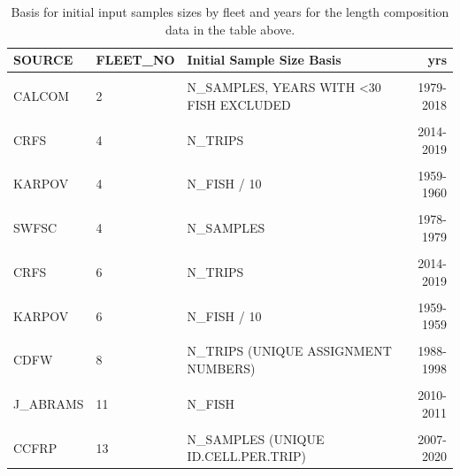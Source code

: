 \documentclass[
  english,
  a4paper,
]{article}
\begin{document}
\begin{table}

\caption{\label{tab:length-inputN}Basis for initial input samples sizes by fleet and years for the length composition data in the table above.}
\centering
\fontsize{10}{12}\selectfont
\begin{tabular}[t]{lllr}
\toprule
SOURCE & FLEET\_NO & Initial Sample Size Basis & yrs\\
\midrule
\cellcolor{gray!6}{CALCOM} & \cellcolor{gray!6}{1} & \cellcolor{gray!6}{N\_SAMPLES, YEARS WITH <30 FISH EXCLUDED} & \cellcolor{gray!6}{1978-2020}\\
CALCOM & 2 & N\_SAMPLES, YEARS WITH <30 FISH EXCLUDED & 1979-2018\\
\cellcolor{gray!6}{CALCOM} & \cellcolor{gray!6}{3} & \cellcolor{gray!6}{N\_SAMPLES, YEARS WITH <30 FISH EXCLUDED} & \cellcolor{gray!6}{1987-1998}\\
CRFS & 4 & N\_TRIPS & 2014-2019\\
\cellcolor{gray!6}{CRFS} & \cellcolor{gray!6}{4} & \cellcolor{gray!6}{N\_TRIPS ESTIMATED FROM AVG. FISH/TRIP} & \cellcolor{gray!6}{2004-2013}\\
KARPOV & 4 & N\_FISH / 10 & 1959-1960\\
\cellcolor{gray!6}{MRFSS} & \cellcolor{gray!6}{4} & \cellcolor{gray!6}{N\_TRIPS ESTIMATED FROM B. SOPER ALGORITHM} & \cellcolor{gray!6}{1980-2003}\\
SWFSC & 4 & N\_SAMPLES & 1978-1979\\
\cellcolor{gray!6}{CRFS} & \cellcolor{gray!6}{5} & \cellcolor{gray!6}{N\_FISH, YEARS WITH <10 FISH EXCLUDED} & \cellcolor{gray!6}{2003-2019}\\
CRFS & 6 & N\_TRIPS & 2014-2019\\
\cellcolor{gray!6}{CRFS} & \cellcolor{gray!6}{6} & \cellcolor{gray!6}{N\_TRIPS ESTIMATED FROM AVG. FISH/TRIP} & \cellcolor{gray!6}{2004-2013}\\
KARPOV & 6 & N\_FISH / 10 & 1959-1959\\
\cellcolor{gray!6}{MRFSS} & \cellcolor{gray!6}{6} & \cellcolor{gray!6}{N\_TRIPS ESTIMATED FROM B. SOPER ALGORITHM} & \cellcolor{gray!6}{1980-2003}\\
CDFW & 8 & N\_TRIPS (UNIQUE ASSIGNMENT NUMBERS) & 1988-1998\\
\cellcolor{gray!6}{NWFSC} & \cellcolor{gray!6}{9} & \cellcolor{gray!6}{EFFECTIVE N  BASED ON STEWART \& HAMEL (2014)} & \cellcolor{gray!6}{2003-2019}\\
J\_ABRAMS & 11 & N\_FISH & 2010-2011\\
\cellcolor{gray!6}{SWFSC} & \cellcolor{gray!6}{12} & \cellcolor{gray!6}{N\_SAMPLES (NUMBER OF HAULS)} & \cellcolor{gray!6}{2002-2016}\\
CCFRP & 13 & N\_SAMPLES (UNIQUE ID.CELL.PER.TRIP) & 2007-2020\\
\bottomrule
\end{tabular}
\end{table}
\end{document}
